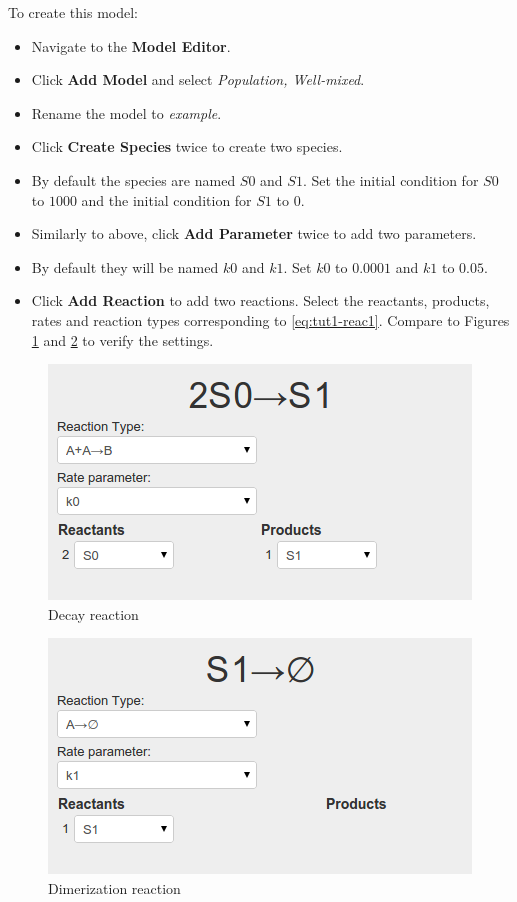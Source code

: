 To create this model:
\begin{itemize}
  \item Navigate to the \textbf{Model Editor}.
  \item Click \textbf{Add Model} and select \textit{Population, Well-mixed}.
  \item Rename the model to \textit{example}.
  \item Click \textbf{Create Species} twice to create two species.
  \item By default the species are named $S0$ and $S1$. Set the initial condition for $S0$ to $1000$ and the initial condition for $S1$ to $0$.
  \item Similarly to above, click \textbf{Add Parameter} twice to add two parameters.
  \item By default they will be named $k0$ and $k1$. Set $k0$ to $0.0001$ and $k1$ to $0.05$.
  \item Click \textbf{Add Reaction} to add two reactions. Select the reactants, products, rates and reaction types corresponding to \eqref{eq:tut1-reac1}. Compare to Figures \ref{fig:reaction2} and \ref{fig:reaction1} to verify the settings.
\end{itemize}

\begin{figure}[!htb]
\centering
\includegraphics[scale=0.64]{T1/reaction2.png}
\caption{Decay reaction}
\label{fig:reaction2}
\end{figure}

\begin{figure}[!htb]
\centering
\includegraphics[scale=0.64]{T1/reaction1.png}
\caption{Dimerization reaction}
\label{fig:reaction1}
\end{figure}

